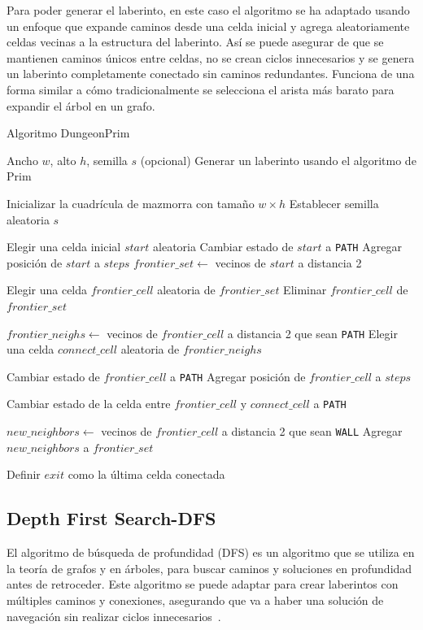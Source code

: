 Para poder generar el laberinto, en este caso el algoritmo se ha adaptado usando un enfoque que expande caminos desde una celda inicial y agrega aleatoriamente celdas vecinas a la estructura del laberinto. Así se puede asegurar de que se mantienen caminos únicos entre celdas, no se crean ciclos innecesarios y se genera un laberinto completamente conectado sin caminos redundantes. Funciona de una forma similar a cómo tradicionalmente se selecciona el arista más barato para expandir el árbol en un grafo.


\begin{algorithm}
\caption{Algoritmo DungeonPrim}
\begin{algorithmic}[1]
\Require Ancho $w$, alto $h$, semilla $s$ (opcional)
\Ensure Generar un laberinto usando el algoritmo de Prim

\State Inicializar la cuadrícula de mazmorra con tamaño $w \times h$
    \State Establecer semilla aleatoria $s$
\EndIf

\State Elegir una celda inicial $start$ aleatoria
\State Cambiar estado de $start$ a \texttt{PATH}
\State Agregar posición de $start$ a $steps$
\State $frontier\_set \gets$ vecinos de $start$ a distancia 2

    \State Elegir una celda $frontier\_cell$ aleatoria de $frontier\_set$
    \State Eliminar $frontier\_cell$ de $frontier\_set$

    \State \small{$frontier\_neighs \gets$ vecinos de $frontier\_cell$ a distancia 2 que sean \texttt{PATH}}
    \State Elegir una celda $connect\_cell$ aleatoria de $frontier\_neighs$

    \State Cambiar estado de $frontier\_cell$ a \texttt{PATH}
    \State Agregar posición de $frontier\_cell$ a $steps$

    \State Cambiar estado de la celda entre $frontier\_cell$ y $connect\_cell$ a \texttt{PATH}

    \State $new\_neighbors \gets$ vecinos de $frontier\_cell$ a distancia 2 que sean \texttt{WALL}
    \State Agregar $new\_neighbors$ a $frontier\_set$
\EndWhile

\State Definir $exit$ como la última celda conectada

\end{algorithmic}
\end{algorithm}


\subsection{Depth First Search-DFS}
El algoritmo de búsqueda de profundidad (DFS) es un algoritmo que se utiliza en la teoría de grafos y en árboles, para buscar caminos y soluciones en profundidad antes de retroceder. Este algoritmo se puede adaptar para crear laberintos con múltiples caminos y conexiones, asegurando que va a haber una solución de navegación sin realizar ciclos innecesarios~\cite{MazeGenAnalysis}.

